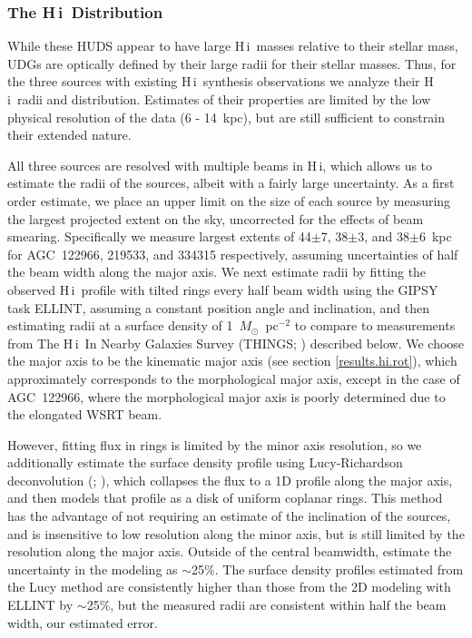 \documentclass[twocolumn]{aastex6}
\newcommand{\msun}{M_{\odot}}
\def\msun{$M_\odot$}
\newcommand{\hi}{H{\sc\,i}}
\begin{document}
\subsubsection{The \hi\ Distribution}
\label{results.hi.dist}

While these HUDS appear to have large \hi\ masses relative to their stellar mass, UDGs are optically defined by their large radii for their stellar masses. Thus,
for the three sources with existing \hi\ synthesis observations we analyze their \hi\ radii and distribution. Estimates of their properties are limited by the low physical resolution of the data (6 - 14~kpc), but are still sufficient to constrain their extended nature. 

All three sources are resolved with multiple beams in \hi, which allows us to estimate the radii of the sources, albeit with a fairly large uncertainty.  As a first order estimate, we place an upper limit on the size of each source by measuring the largest projected extent on the sky, uncorrected for the effects of beam smearing. Specifically we measure largest extents of 44$\pm$7, 38$\pm$3, and 38$\pm$6~kpc for AGC~122966, 219533, and 334315 respectively, assuming uncertainties of half the beam width along the major axis.
We next estimate radii by fitting the observed \hi\ profile with tilted rings every half beam width using the GIPSY task ELLINT, assuming a constant position angle and inclination, and then estimating radii at a surface density of 1~\msun~pc$^{-2}$ to compare to measurements from The \hi\ In Nearby Galaxies Survey (THINGS; \citealp{walter08a}) described below. We choose the major axis to be %
the kinematic major axis (see section \ref{results.hi.rot}), which approximately corresponds to the morphological major axis, except in the case of AGC~122966, where the morphological major axis is poorly determined due to the elongated WSRT beam.  

However, fitting flux in rings is limited by the minor axis resolution, so we additionally estimate the surface density profile using Lucy-Richardson deconvolution (\citealp{lucy74a}; \citealp{warmels88c}), which collapses the flux to a 1D profile along the major axis, and then models that profile as a disk of uniform coplanar rings. This method has the advantage of not requiring an estimate of the inclination of the sources, and is insensitive to low resolution along the minor axis, but is still limited by the resolution along the major axis. Outside of the central beamwidth, \cite{warmels88c} estimate the uncertainty in the modeling as $\sim$25\%. The surface density profiles estimated from the Lucy method are consistently higher than those from the 2D modeling with ELLINT by $\sim$25\%, but the measured radii are consistent within half the beam width, our estimated error. 
\end{document}
